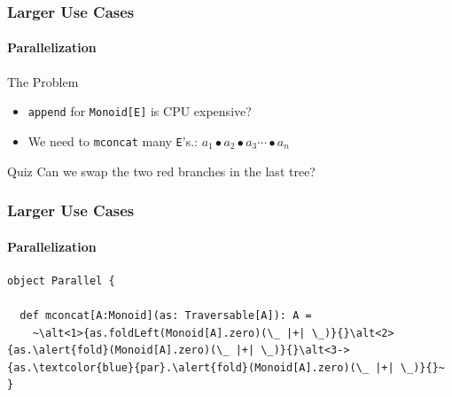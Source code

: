 \documentclass{beamer}
\begin{document}
\begin{frame}
  \frametitle{Larger Use Cases}
  \framesubtitle{Parallelization}
  \begin{block}{The Problem}
    \begin{itemize}
      \item \texttt{append} for \texttt{Monoid[E]} is CPU expensive?
      \item We need to \texttt{mconcat} many \texttt{E}'s.: \(a_1 \bullet a_2 \bullet a_3 \dotsb \bullet a_n\)
    \end{itemize}
  \end{block}

\pause


\begin{block}{Quiz}
  Can we swap the two red branches in the last tree?
\end{block}
\end{frame}

\begin{frame}[fragile]
  \frametitle{Larger Use Cases}
  \framesubtitle{Parallelization}

  \begin{block}{}
  \begin{lstlisting}
object Parallel {

  def mconcat[A:Monoid](as: Traversable[A]): A =
    ~\alt<1>{as.foldLeft(Monoid[A].zero)(\_ |+| \_)}{}\alt<2>{as.\alert{fold}(Monoid[A].zero)(\_ |+| \_)}{}\alt<3->{as.\textcolor{blue}{par}.\alert{fold}(Monoid[A].zero)(\_ |+| \_)}{}~
}
  \end{lstlisting}
  \end{block}

\end{frame}
\end{document}
